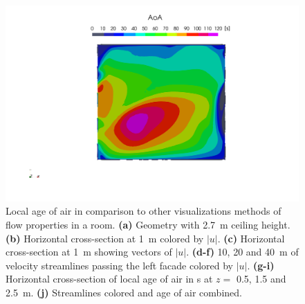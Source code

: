 \begin{figure}
	\vspace*{0.4cm}
	\includegraphics[scale=.06, trim= 72cm 160cm 65cm 20cm, clip]{images/AoA/scale_AoA}
	\centering
	\hfil	
	\captionsetup{format=plain}
	\caption[Local age of air in comparison to other visualisations methods of flow properties in a room.]{Local age of air in comparison to other visualizations methods of flow properties in a room. \textbf{(a)} Geometry with \SI{2.7}{\metre} ceiling height. \textbf{(b)} Horizontal cross-section at \SI{1}{\metre} colored by  $|u|$. \textbf{(c)} Horizontal cross-section at \SI{1}{\metre} showing vectors of $|u|$. \textbf{(d-f)} \num{10}, \num{20} and \SI{40}{\metre} of velocity streamlines passing the left facade colored by $|u|$.  \textbf{(g-i)} Horizontal cross-section of local age of air in \si{\second} at $z =$ \num{0.5}, \num{1.5} and \SI{2.5}{\metre}. \textbf{(j)} Streamlines colored and age of air combined.}
	\label{fig:Age_of_air_single_classroom}
\end{figure}







